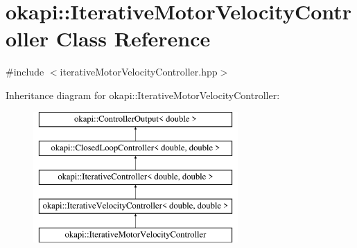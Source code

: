 \hypertarget{classokapi_1_1IterativeMotorVelocityController}{}\section{okapi\+::Iterative\+Motor\+Velocity\+Controller Class Reference}
\label{classokapi_1_1IterativeMotorVelocityController}


{\ttfamily \#include $<$iterative\+Motor\+Velocity\+Controller.\+hpp$>$}

Inheritance diagram for okapi\+::Iterative\+Motor\+Velocity\+Controller\+:\begin{figure}[H]
\begin{center}
\leavevmode
\includegraphics[height=5.000000cm]{classokapi_1_1IterativeMotorVelocityController}
\end{center}
\end{figure}
